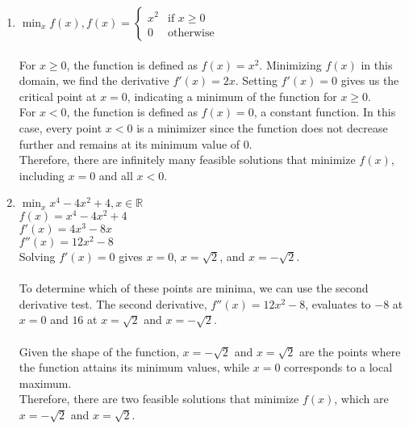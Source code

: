 \documentclass{assignment}
\newcommand{\R}{\mathbb{R}}
\begin{document}
\begin{problem}
\begin{enumerate}
\begin{enumerate}
\item $ \min_x f(x), f(x) = \begin{cases} 
x^2 & \text{if } x \geq 0 \\
0 & \text{otherwise}
\end{cases}$\\\\

    For $x \geq 0$, the function is defined as $f(x) = x^2$. Minimizing $f(x)$ in this domain, we find the derivative $f'(x) = 2x$. Setting $f'(x) = 0$ gives us the critical point at $x = 0$, indicating a minimum of the function for $x \geq 0$.\\
    
    For $x < 0$, the function is defined as $f(x) = 0$, a constant function. In this case, every point $x < 0$ is a minimizer since the function does not decrease further and remains at its minimum value of 0.\\
    
    Therefore, there are infinitely many feasible solutions that minimize $f(x)$, including $x = 0$ and all $x < 0$.\\
    

\item $\min_x x^4 - 4x^2 + 4, x \in \R$\\

    $f(x) = x^4 - 4x^2 + 4$\\
    $f'(x) = 4x^3 - 8x$\\
    $f''(x) = 12x^2 - 8$\\

    Solving $f'(x) = 0$ gives $x = 0$, $x = \sqrt{2}$, and $x = -\sqrt{2}$.\\\\
    
    To determine which of these points are minima, we can use the second derivative test. The second derivative, $f''(x) = 12x^2 - 8$, evaluates to $-8$ at $x = 0$ and $16$ at $x = \sqrt{2}$ and $x = -\sqrt{2}$.\\\\
    
    Given the shape of the function, $x = -\sqrt{2}$ and $x = \sqrt{2}$ are the points where the function attains its minimum values, while $x = 0$ corresponds to a local maximum.\\

    Therefore, there are two feasible solutions that minimize $f(x)$, which are $x = -\sqrt{2}$ and $x = \sqrt{2}$.\\


\end{enumerate}
\end{enumerate}
\end{problem}
\end{document}
